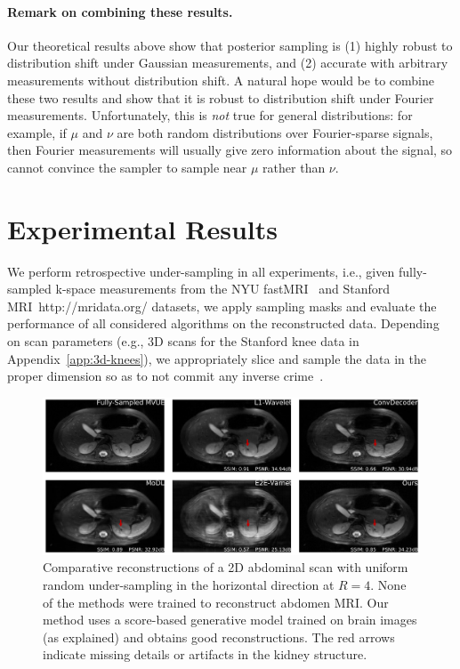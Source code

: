 \paragraph{Remark on combining these results.}  Our theoretical results above show that posterior sampling is (1) highly robust to distribution shift under Gaussian measurements, and (2) accurate with arbitrary measurements without distribution shift.  A natural hope would be to combine these two results and show that it is robust to distribution shift under Fourier measurements.  Unfortunately, this is \emph{not} true for general distributions: for example, if $\mu$ and $\nu$ are both random distributions over Fourier-sparse signals, then Fourier measurements will usually give zero information about the signal, so cannot convince the sampler to sample near $\mu$ rather than $\nu$.


\section{Experimental Results}\label{sec:exp}
We perform retrospective under-sampling in all experiments, i.e., given fully-sampled k-space measurements from the NYU fastMRI~\cite{knoll2020fastmri,zbontar2018fastMRI} and Stanford MRI~http://mridata.org/ datasets, we apply sampling masks and evaluate the performance of all considered algorithms on the reconstructed data. Depending on scan parameters (e.g., 3D scans for the Stanford knee data in Appendix~\ref{app:3d-knees}), we appropriately slice and sample the data in the proper dimension so as to not commit any inverse crime~\cite{guerquin2011realistic,shimron2021subtle}.

\begin{figure}
\begin{center}
    \includegraphics[width=\columnwidth]{abdomen-random-horizontal-R=4-slice=9-comp-annotated.pdf}
\end{center}
\caption{\small Comparative reconstructions of a 2D abdominal scan
    with uniform random under-sampling in the horizontal direction at
    $R=4$. None of the methods were trained to reconstruct abdomen
    MRI. Our method uses a score-based generative model trained on
    brain images (as explained) and obtains good reconstructions. The
    red arrows indicate missing details or artifacts in the kidney
    structure. 
}
\label{fig:abdomen-equi-horizontal-recons}
\end{figure}


